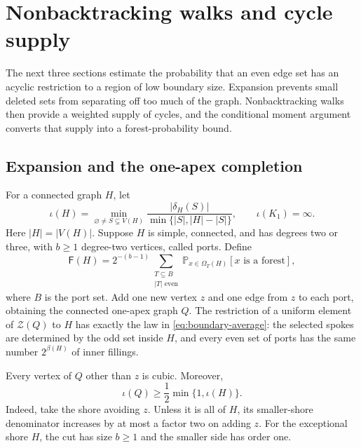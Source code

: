 \documentclass[11pt,a4paper]{article}
\numberwithin{equation}{section}
\theoremstyle{definition}
\theoremstyle{remark}
\newcommand{\Fav}{\mathsf F}
\newcommand{\cZ}{\mathcal Z}
\newcommand{\Om}{\Omega}
\newcommand{\Prob}{\mathbb P}
\begin{document}
\section{Nonbacktracking walks and cycle supply}\label{sec:analytic-basics}
The next three sections estimate the probability that an even edge set has an acyclic restriction to a region of low boundary size. Expansion prevents small deleted sets from separating off too much of the graph. Nonbacktracking walks then provide a weighted supply of cycles, and the conditional moment argument converts that supply into a forest-probability bound.

\subsection{Expansion and the one-apex completion}
For a connected graph $H$, let
\[
 \iota(H)=\min_{\varnothing\ne S\subsetneq V(H)}
       \frac{|\delta_H(S)|}{\min\{|S|,|H|-|S|\}},\qquad \iota(K_1)=\infty.
\]
Here $|H|=|V(H)|$. Suppose $H$ is simple, connected, and has degrees two or three, with $b\ge1$ degree-two vertices, called ports. Define
\begin{equation}\label{eq:boundary-average}
 \Fav(H)=2^{-(b-1)}\sum_{\substack{T\subseteq B\\|T|\text{ even}}}
           \Prob_{x\in\Om_T(H)}[x\text{ is a forest}],
\end{equation}
where $B$ is the port set. Add one new vertex $z$ and one edge from $z$ to each port, obtaining the connected one-apex graph $Q$. The restriction of a uniform element of $\cZ(Q)$ to $H$ has exactly the law in \eqref{eq:boundary-average}: the selected spokes are determined by the odd set inside $H$, and every even set of ports has the same number $2^{\beta(H)}$ of inner fillings.

Every vertex of $Q$ other than $z$ is cubic. Moreover,
\begin{equation}\label{eq:apex-expansion}
 \iota(Q)\ge\frac12\min\{1,\iota(H)\}.
\end{equation}
Indeed, take the shore avoiding $z$. Unless it is all of $H$, its smaller-shore denominator increases by at most a factor two on adding $z$. For the exceptional shore $H$, the cut has size $b\ge1$ and the smaller side has order one.
\end{document}
